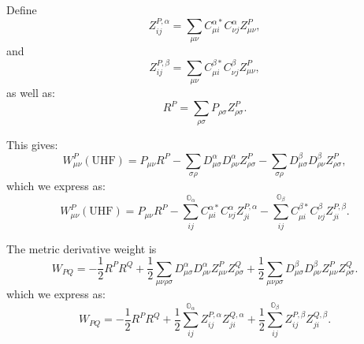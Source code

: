 \documentclass[aip,preprint]{revtex4-1}
\begin{document}
Define
\begin{equation}
Z^{P,\alpha}_{ij} = \sum_{\mu\nu} C_{\mu i}^{\alpha*} C_{\nu j}^{\alpha} Z^P_{\mu\nu},
\end{equation}
and
\begin{equation}
Z^{P,\beta}_{ij} = \sum_{\mu\nu} C_{\mu i}^{\beta*} C_{\nu j}^{\beta} Z^P_{\mu\nu},
\end{equation}
as well as:
\begin{equation}
R^P = \sum_{\rho\sigma}P_{\rho\sigma}
Z^P_{\rho\sigma}.
\end{equation}

This gives:
\begin{equation}
W^P_{\mu\nu}(\mathrm{UHF})
=
P_{\mu\nu} R^P
-\sum_{\sigma\rho}D^{\alpha}_{\mu\sigma} D^{\alpha}_{\rho\nu}Z^P_{\rho\sigma}
-\sum_{\sigma\rho}D^{\beta}_{\mu\sigma} D^{\beta}_{\rho\nu}Z^P_{\rho\sigma},
\end{equation}
which we express as:
\begin{equation}
W^P_{\mu\nu}(\mathrm{UHF})
=
P_{\mu\nu} R^P
-\sum_{ij}^{\mathbb{O}_\alpha} C^{\alpha*}_{\mu i} C^{\alpha}_{\nu j} Z^{P,\alpha}_{ji}
-\sum_{ij}^{\mathbb{O}_\beta} C^{\beta*}_{\mu i} C^{\beta}_{\nu j} Z^{P,\beta}_{ji}.
\label{eq:uhf_w3_aux}
\end{equation}

The metric derivative weight is
\begin{equation}
W_{PQ}
=
-\frac{1}{2}
R^P R^Q
+
\frac{1}{2}
\sum_{\mu\nu\rho\sigma}D^{\alpha}_{\mu\sigma}D^{\alpha}_{\rho\nu}Z^P_{\mu\nu}Z^Q_{\rho\sigma}
+
\frac{1}{2}
\sum_{\mu\nu\rho\sigma}D^{\beta}_{\mu\sigma}D^{\beta}_{\rho\nu}Z^P_{\mu\nu}Z^Q_{\rho\sigma}.
\end{equation}
which we express as:
\begin{equation}
W_{PQ}
=
-\frac{1}{2}
R^P R^Q
+\frac{1}{2}
\sum_{ij}^\mathbb{O_\alpha} Z^{P,\alpha}_{ij} Z^{Q,\alpha}_{ji}
+\frac{1}{2}
\sum_{ij}^\mathbb{O_\beta} Z^{P,\beta}_{ij} Z^{Q,\beta}_{ji}.
\label{eq:uhf_w2_aux}
\end{equation}
\end{document}
